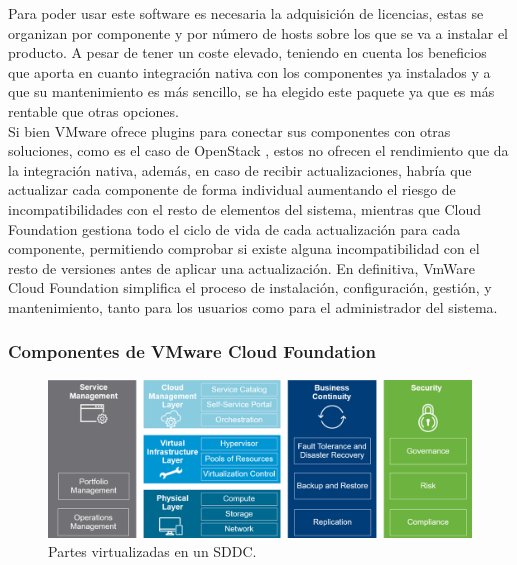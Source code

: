 
Para poder usar este software es necesaria la adquisición de licencias, estas se organizan por componente y por número de hosts sobre los que se va a instalar el producto. A pesar de tener un coste elevado, teniendo en cuenta los beneficios que aporta en cuanto integración nativa con los componentes ya instalados y a que su mantenimiento es más sencillo, se ha elegido este paquete ya que es más rentable que otras opciones. \\
Si bien VMware ofrece plugins para conectar sus componentes con otras soluciones, como es el caso de OpenStack \cite{opestackintegrated}, estos no ofrecen el rendimiento que da la integración nativa, además, en caso de recibir actualizaciones, habría que actualizar cada componente de forma individual aumentando el riesgo de incompatibilidades con el resto de elementos del sistema, mientras que Cloud Foundation gestiona todo el ciclo de vida de cada actualización para cada componente, permitiendo comprobar si existe alguna incompatibilidad con el resto de versiones antes de aplicar una actualización. En definitiva, VmWare Cloud Foundation simplifica el proceso de instalación, configuración, gestión, y mantenimiento, tanto para los usuarios como para el administrador del sistema.

\subsubsection{Componentes de VMware Cloud Foundation \cite{componentesCloudFound}}
\label{subsubsect:cfcomponents}

\begin{figure}[h!]
  \centering
  \includegraphics[width=1\textwidth]{imaxes/cap2recursos/SDDCoverview.png}
  \caption{Partes virtualizadas en un SDDC.}
  \label{fig:sddcoverview}
\end{figure}
\FloatBarrier

